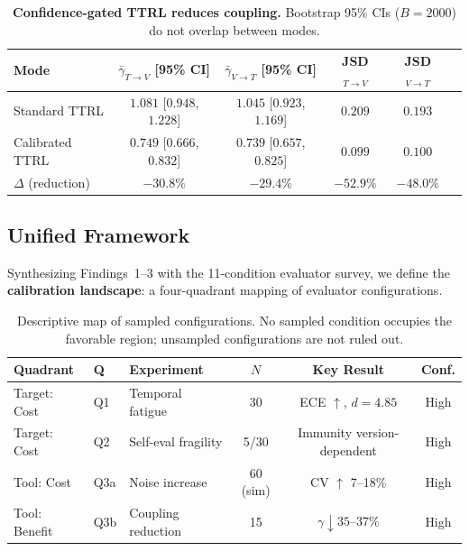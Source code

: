 \documentclass[11pt]{article}
\begin{document}
\begin{table}[H]
\centering
\caption{\textbf{Confidence-gated TTRL reduces coupling.} Bootstrap 95\% CIs ($B{=}2000$) do not overlap between modes.}
\label{tab:coupling}
\begin{tabular}{@{}lccccc@{}}
\toprule
Mode & $\bar{\gamma}_{T \to V}$ [95\% CI] & $\bar{\gamma}_{V \to T}$ [95\% CI] & JSD$_{T \to V}$ & JSD$_{V \to T}$ \\
\midrule
Standard TTRL & $1.081$ [$0.948$, $1.228$] & $1.045$ [$0.923$, $1.169$] & $0.209$ & $0.193$ \\
Calibrated TTRL & $0.749$ [$0.666$, $0.832$] & $0.739$ [$0.657$, $0.825$] & $0.099$ & $0.100$ \\
\midrule
$\Delta$ (reduction) & $-30.8\%$ & $-29.4\%$ & $-52.9\%$ & $-48.0\%$ \\
\bottomrule
\end{tabular}
\end{table}


\subsection{Unified Framework}

Synthesizing Findings~1--3 with the 11-condition evaluator survey, we define the \textbf{calibration landscape}: a four-quadrant mapping of evaluator configurations.

\begin{table}[H]
\centering
\caption{Descriptive map of sampled configurations. No sampled condition occupies the favorable region; unsampled configurations are not ruled out.}
\begin{tabular}{@{}lllccc@{}}
\toprule
Quadrant & Q & Experiment & $N$ & Key Result & Conf. \\
\midrule
Target: Cost & Q1 & Temporal fatigue & 30 & ECE $\uparrow$, $d{=}4.85$ & High \\
Target: Cost & Q2 & Self-eval fragility & 5/30 & Immunity version-dependent & High \\
Tool: Cost & Q3a & Noise increase & 60 (sim) & CV $\uparrow$ 7--18\% & High \\
Tool: Benefit & Q3b & Coupling reduction & 15 & $\gamma \downarrow 35$--$37\%$ & High \\
\bottomrule
\end{tabular}
\end{table}
\end{document}
